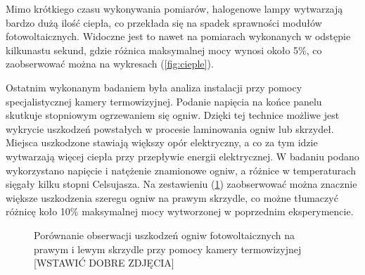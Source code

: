 \documentclass[12pt, a4paper]{article}
\let\oldref\ref
\renewcommand{\ref}[1]{(\oldref{#1})}
\begin{document}
Mimo krótkiego czasu wykonywania pomiarów, halogenowe lampy wytwarzają bardzo dużą ilość ciepła, co przekłada się na spadek sprawności modułów fotowoltaicznych. Widoczne jest to nawet na pomiarach wykonanych w odstępie kilkunastu sekund, gdzie różnica maksymalnej mocy wynosi około 5\%, co zaobserwować można na wykresach \ref{fig:cieple}. 

Ostatnim wykonanym badaniem była analiza instalacji przy pomocy specjalistycznej kamery termowizyjnej. Podanie napięcia na końce panelu skutkuje stopniowym ogrzewaniem się ogniw. Dzięki tej technice możliwe jest wykrycie uszkodzeń powstałych w procesie laminowania ogniw lub skrzydeł. Miejsca uszkodzone stawiają większy opór elektryczny, a co za tym idzie wytwarzają więcej ciepła przy przepływie energii elektrycznej. W badaniu podano wykorzystano napięcie i natężenie znamionowe ogniw, a różnice w temperaturach sięgały kilku stopni Celsujasza. Na zestawieniu \ref{fig:uszkodzenia} zaobserwować można znacznie większe uszkodzenia szeregu ogniw na prawym skrzydle, co możne tłumaczyć różnicę koło 10\% maksymalnej mocy wytworzonej w poprzednim eksperymencie.

\begin{figure}[ht]
    \centering
    \qquad
    \caption{Porównanie obserwacji uszkodzeń ogniw fotowoltaicznych na prawym i lewym skrzydle przy pomocy kamery termowizyjnej [WSTAWIĆ DOBRE ZDJĘCIA]}
    \label{fig:uszkodzenia}
\end{figure}
\end{document}

